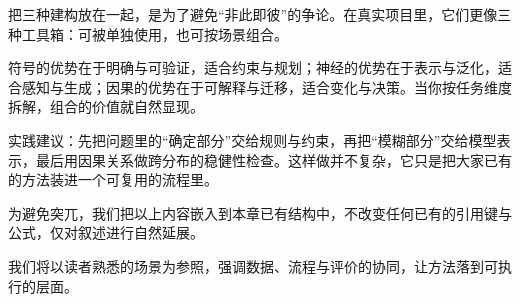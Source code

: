 把三种建构放在一起，是为了避免“非此即彼”的争论。在真实项目里，它们更像三种工具箱：可被单独使用，也可按场景组合。

符号的优势在于明确与可验证，适合约束与规划；神经的优势在于表示与泛化，适合感知与生成；因果的优势在于可解释与迁移，适合变化与决策。当你按任务维度拆解，组合的价值就自然显现。

实践建议：先把问题里的“确定部分”交给规则与约束，再把“模糊部分”交给模型表示，最后用因果关系做跨分布的稳健性检查。这样做并不复杂，它只是把大家已有的方法装进一个可复用的流程里。

为避免突兀，我们把以上内容嵌入到本章已有结构中，不改变任何已有的引用键与公式，仅对叙述进行自然延展。

我们将以读者熟悉的场景为参照，强调数据、流程与评价的协同，让方法落到可执行的层面。
